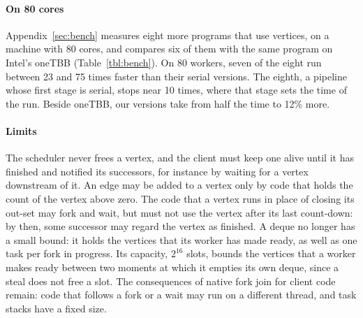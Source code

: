 \documentclass[sigplan,nonacm]{acmart}
\begin{document}
\paragraph{On 80 cores}
%
Appendix~\ref{sec:bench} measures eight more programs that use
vertices, on a machine with 80 cores, and compares six of them with
the same program on Intel's oneTBB (Table~\ref{tbl:bench}).
%
On 80 workers, seven of the eight run between 23 and 75 times faster
than their serial versions.
%
The eighth, a pipeline whose first stage is serial, stops near 10
times, where that stage sets the time of the run.
%
Beside oneTBB, our versions take from half the time to 12\% more.

\paragraph{Limits}
%
The scheduler never frees a vertex, and the client must keep one alive
until it has finished and notified its successors, for instance by
waiting for a vertex downstream of it.
%
An edge may be added to a vertex only by code that holds the count of
the vertex above zero.
%
The code that a vertex runs in place of closing its out-set may fork
and wait, but must not use the vertex after its last count-down: by
then, some successor may regard the vertex as finished.
%
A deque no longer has a small bound: it holds the vertices that its
worker has made ready, as well as one task per fork in progress.
%
Its capacity, $2^{16}$ slots, bounds the vertices that a worker makes
ready between two moments at which it empties its own deque, since a
steal does not free a slot.
%
The consequences of native fork join for client code remain: code that
follows a fork or a wait may run on a different thread, and task stacks
have a fixed size.
\end{document}

